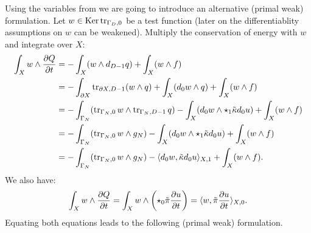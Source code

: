 \begin{discussion}
  Using the variables from
  we are going to introduce an alternative (primal weak) formulation.
  Let $w \in \mathop{\rm Ker}\nolimits \mathop{\rm tr}\nolimits_{\Gamma_D, 0}$ be a test function
  (later on the differentiablity assumptions on $w$ can be weakened).
  Multiply the conservation of energy with $w$ and integrate over $X$:
  \begin{equation}
    \begin{split}
      \int_X w \wedge \frac{\partial Q}{\partial t}
      & = - \int_X (w \wedge d_{D - 1} q) + \int_X (w \wedge f) \\
      & = - \int_{\partial X} \mathop{\rm tr}\nolimits_{\partial X, D - 1} (w \wedge q)
        + \int_X (d_0 w \wedge q)
        + \int_X (w \wedge f) \\
      & =
        - \int_{\Gamma_N}
          (\mathop{\rm tr}\nolimits_{\Gamma_N, 0} w \wedge \mathop{\rm tr}\nolimits_{\Gamma_N, D - 1} q)
        - \int_X (d_0 w \wedge \star_1 \tilde{\kappa} d_0 u)
        + \int_X (w \wedge f) \\
      & = - \int_{\Gamma_N} (\mathop{\rm tr}\nolimits_{\Gamma_N, 0} w \wedge g_N)
        - \int_X (d_0 w \wedge \star_1 \tilde{\kappa} d_0 u)
        + \int_X (w \wedge f) \\
      & = - \int_{\Gamma_N} (\mathop{\rm tr}\nolimits_{\Gamma_N, 0} w \wedge g_N)
        - \langle d_0 w,\tilde{\kappa} d_0 u\rangle_{X, 1}
        + \int_X (w \wedge f).
    \end{split}
  \end{equation}
  We also have:
  \begin{equation}
    \int_X w \wedge \frac{\partial Q}{\partial t}
    = \int_X w \wedge
      \left(\star_0 \tilde{\pi} \frac{\partial u}{\partial t}\right)
    =  \langle w,\tilde{\pi} \frac{\partial u}{\partial t}\rangle_{X, 0}.
  \end{equation}
  Equating both equations leads to the following (primal weak) formulation.
\end{discussion}
